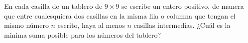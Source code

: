 \begin{problem}
    En cada casilla de un tablero de $9\times9$ se escribe un entero positivo, de manera que entre cualesquiera dos casillas en la misma fila o columna que tengan el mismo n\'umero
    $n$ escrito, haya al menos $n$ casillas intermedias.
    ¿Cu\'al es la minima suma posible para los n\'umeros del tablero?
    \label{24ORO3}
\end{problem}